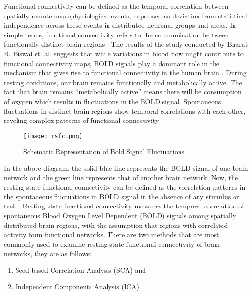 \documentclass[12pt]{article}
\begin{document}
Functional connectivity can be defined as the temporal correlation
between spatially remote neurophysiological events, expressed as
deviation from statistical independence across these events in
distributed neuronal groups and areas. In simple terms, functional
connectivity refers to the communication be tween functionally
distinct brain regions \cite{functionalConnectivityNikin}. The results
of the study conducted by Bharat B. Biswal et. al. suggests that while
variations in blood flow might contribute to functional connectivity
maps, BOLD signals play a dominant role in the mechanism that gives
rise to functional connectivity in the human brain
\cite{biswalsimultaneous}. During resting conditions, our brain
remains functionally and metabolically active. The fact that brain
remains ``metabolically active'' means there will be consumption of
oxygen which results in fluctuations in the BOLD signal. Spontaneous
fluctuations in distinct brain regions show temporal correlations with
each other, reveling complex patterns of functional connectivity
\cite{biswal1995functional}.

\begin{figure}[H]
  \centering
  \texttt{[image: rsfc.png]}
  \caption{Schematic Representation of Bold Signal Fluctuations}
\end{figure}

In the above diagram, the solid blue line represents the BOLD signal
of one brain network and the green line represents that of
another brain network. Now, the resting state functional connectivity
can be defined as the correlation patterns in the spontaneous
fluctuations in BOLD signal in the absence of any stimulus or task
\cite{frontiers:rsfc}. Resting-state functional connectivity measures
the temporal correlation of spontaneous Blood Oxygen Level Dependent
(BOLD) signals among spatially distributed brain regions, with the
assumption that regions with correlated activity form functional
networks. There are two methods that are most commonly used to examine
resting state functional connectivity of brain networks, they are as
follows:

\begin{enumerate}[nosep]
  \item Seed-based Correlation Analysis (SCA) and
  \item Independent Components Analysis (ICA)
\end{enumerate}
\end{document}

